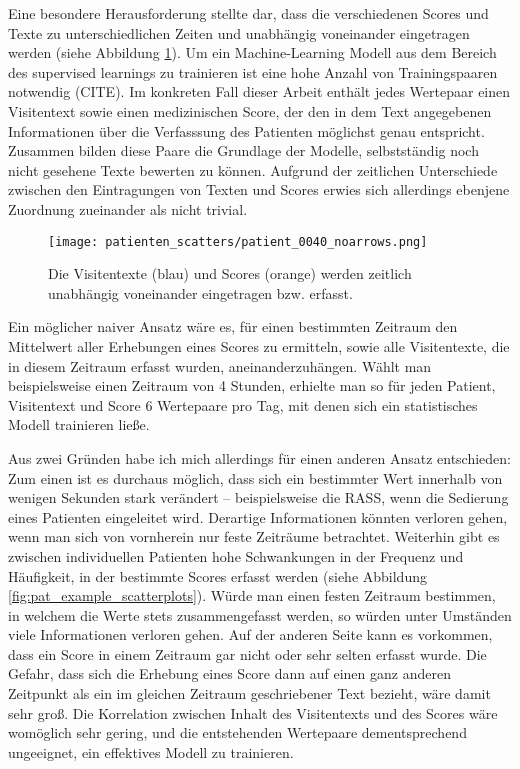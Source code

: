 Eine besondere Herausforderung stellte dar, dass die verschiedenen Scores und Texte zu unterschiedlichen Zeiten und unabhängig voneinander eingetragen werden (siehe Abbildung \ref{fig:pat40_scatter}).
Um ein Machine-Learning Modell aus dem Bereich des supervised learnings  zu trainieren ist eine hohe Anzahl von Trainingspaaren notwendig (CITE). Im konkreten Fall dieser Arbeit enthält jedes Wertepaar einen Visitentext sowie einen medizinischen Score, der den in dem Text angegebenen Informationen über die Verfasssung des Patienten möglichst genau entspricht. Zusammen bilden diese Paare die Grundlage der Modelle, selbstständig noch nicht gesehene Texte bewerten zu können. Aufgrund der zeitlichen Unterschiede zwischen den Eintragungen von Texten und Scores erwies sich allerdings ebenjene Zuordnung zueinander als nicht trivial. 

\begin{figure}[htb]
    \captionsetup{justification=centering}
    \centering
    \texttt{[image: patienten\_scatters/patient\_0040\_noarrows.png]}
    \caption{Die Visitentexte (blau) und Scores (orange) werden zeitlich unabhängig voneinander eingetragen bzw. erfasst.}
    \label{fig:pat40_scatter}
\end{figure}

Ein möglicher naiver Ansatz wäre es, für einen bestimmten Zeitraum den Mittelwert aller Erhebungen eines Scores zu ermitteln, sowie alle Visitentexte, die in diesem Zeitraum erfasst wurden, aneinanderzuhängen. Wählt man beispielsweise einen Zeitraum von 4 Stunden, erhielte man so für jeden Patient, Visitentext und Score 6 Wertepaare pro Tag, mit denen sich ein statistisches Modell trainieren ließe.

Aus zwei Gründen habe ich mich allerdings für einen anderen Ansatz entschieden: Zum einen ist es durchaus möglich, dass sich ein bestimmter Wert innerhalb von wenigen Sekunden stark verändert -- beispielsweise die RASS, wenn die Sedierung eines Patienten eingeleitet wird. Derartige Informationen könnten verloren gehen, wenn man sich von vornherein nur feste Zeiträume betrachtet. Weiterhin gibt es zwischen individuellen Patienten hohe Schwankungen in der Frequenz und Häufigkeit, in der bestimmte Scores erfasst werden (siehe Abbildung \ref{fig:pat_example_scatterplots}). Würde man einen festen Zeitraum bestimmen, in welchem die Werte stets zusammengefasst werden, so würden unter Umständen viele Informationen verloren gehen. Auf der anderen Seite kann es vorkommen, dass ein Score in einem Zeitraum gar nicht oder sehr selten erfasst wurde. Die Gefahr, dass sich die Erhebung eines Score dann auf einen ganz anderen Zeitpunkt als ein im gleichen Zeitraum geschriebener Text bezieht, wäre damit sehr groß. Die Korrelation zwischen Inhalt des Visitentexts und des Scores wäre womöglich sehr gering, und die entstehenden Wertepaare dementsprechend ungeeignet, ein effektives Modell zu trainieren.

